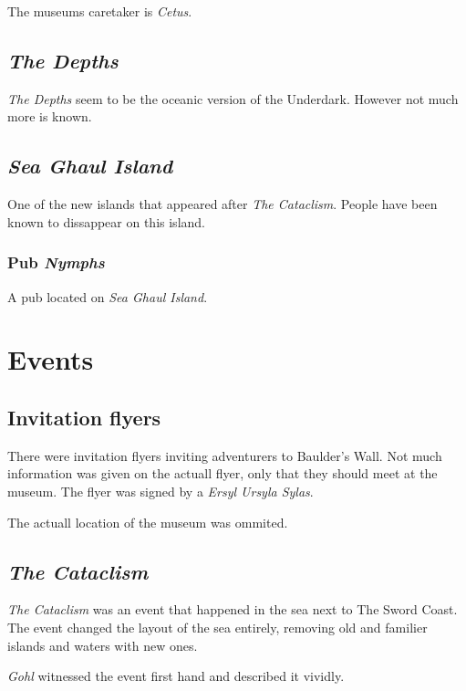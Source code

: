 \documentclass{article}
\begin{document}
\begin{multicols}{2}
    The museums caretaker is \textit{Cetus}.

    \subsection{\textit{The Depths}}

    \textit{The Depths} seem to be the oceanic version of the Underdark. However not much more is known.

    \subsection{\textit{Sea Ghaul Island}}

    One of the new islands that appeared after \textit{The Cataclism}. People have been known to dissappear on this island.

    \subsubsection{Pub \textit{Nymphs}}

    A pub located on \textit{Sea Ghaul Island}.

    \section{Events}

    \subsection{Invitation flyers}

    There were invitation flyers inviting adventurers to Baulder's Wall. Not much information was given on the actuall flyer, only that they should meet at the museum. The flyer was signed by a
    \textit{Ersyl Ursyla Sylas}.

    The actuall location of the museum was ommited.

    \subsection{\textit{The Cataclism}}

    \textit{The Cataclism} was an event that happened in the sea next to The Sword Coast. The event changed the layout of the sea entirely, removing old and familier islands and waters with new ones.

    \textit{Gohl} witnessed the event first hand and described it vividly.


\end{multicols}
\end{document}
